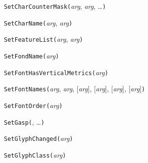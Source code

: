 

\texttt{SetCharCounterMask(}\textit{arg}, \textit{arg}, \ldots\texttt{)}



\texttt{SetCharName(}\textit{arg}, \textit{arg}\texttt{)}



\texttt{SetFeatureList(}\textit{arg}, \textit{arg}\texttt{)}



\texttt{SetFondName(}\textit{arg}\texttt{)}



\texttt{SetFontHasVerticalMetrics(}\textit{arg}\texttt{)}



\texttt{SetFontNames(}\textit{arg}, \textit{arg}, [\textit{arg}], [\textit{arg}], [\textit{arg}], [\textit{arg}]\texttt{)}



\texttt{SetFontOrder(}\textit{arg}\texttt{)}



\texttt{SetGasp(}, \ldots\texttt{)}



\texttt{SetGlyphChanged(}\textit{arg}\texttt{)}



\texttt{SetGlyphClass(}\textit{arg}\texttt{)}




